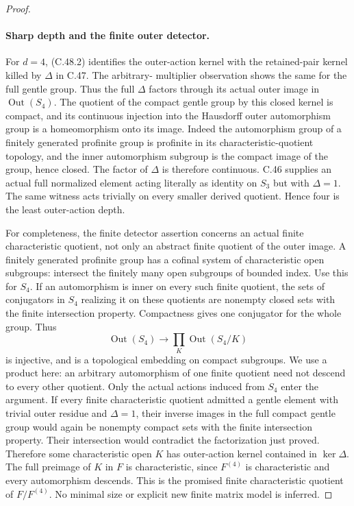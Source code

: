 \begin{proof}
\paragraph{Sharp depth and the finite outer detector.}
For $d=4$, (C.48.2) identifies the outer-action kernel with the
retained-pair kernel killed by $\Delta$ in C.47. The arbitrary-
multiplier observation shows the same for the full gentle group.
Thus the full $\Delta$ factors through its actual outer image
in $\operatorname{Out}(S_4)$.
The quotient of the compact gentle group by this closed kernel is
compact, and its continuous injection into the Hausdorff outer
automorphism group is a homeomorphism onto its image. Indeed the
automorphism group of a finitely generated profinite group is
profinite in its characteristic-quotient topology, and the inner
automorphism subgroup is the compact image of the group, hence
closed. The factor
of $\Delta$ is therefore continuous.
C.46 supplies an actual full normalized element acting literally
as identity on $S_3$ but with $\Delta=1$. The same witness acts
trivially on every smaller derived quotient. Hence four is the
least outer-action depth.

For completeness, the finite detector assertion concerns an actual
finite characteristic quotient, not only an abstract finite quotient
of the outer image. A finitely generated profinite group has a
cofinal system of characteristic open subgroups: intersect the
finitely many open subgroups of bounded index. Use this for $S_4$.
If an automorphism is inner on every such finite quotient, the sets
of conjugators in $S_4$ realizing it on these quotients are nonempty
closed sets with the finite intersection property. Compactness gives
one conjugator for the whole group. Thus
\[
 \operatorname{Out}(S_4)\longrightarrow
       \prod_K\operatorname{Out}(S_4/K)           \tag{C.48.10}
\]
is injective, and is a topological embedding on compact subgroups.
We use a product here: an arbitrary automorphism of one finite
quotient need not descend to every other quotient. Only the actual
actions induced from $S_4$ enter the argument.
If every finite characteristic quotient admitted a gentle element
with trivial outer residue and $\Delta=1$, their inverse images in
the full compact gentle group would again be nonempty compact sets with the finite
intersection property. Their intersection would contradict the
factorization just proved. Therefore some characteristic open $K$
has outer-action kernel contained in $\ker\Delta$.
The full preimage of $K$ in $F$ is characteristic, since $F^{(4)}$
is characteristic and every automorphism descends. This is the
promised finite characteristic quotient of $F/F^{(4)}$.
No minimal size or explicit new finite matrix model is inferred.
\end{proof}

